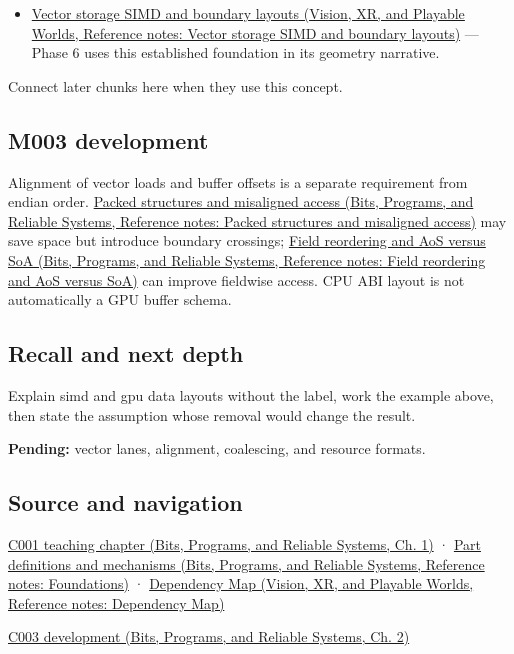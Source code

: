 \begin{itemize}
\tightlist
\item
  \href{../07-Vision-XR-and-Playable-Worlds/main.pdf\#nameddest=appendix-26bf6bf2fb8b}{Vector storage SIMD and boundary layouts (Vision, XR, and Playable Worlds, Reference notes: Vector storage SIMD and boundary layouts)} --- Phase 6 uses this established foundation in its geometry narrative.
\end{itemize}

Connect later chunks here when they use this concept.

\subsection{M003 development}\label{appendix-3c7b1a56de01-m003-development}

Alignment of vector loads and buffer offsets is a separate requirement from endian order. \href{../01-Bits-Programs-and-Reliable-Systems/main.pdf\#nameddest=appendix-0682dbfc5f0e}{Packed structures and misaligned access (Bits, Programs, and Reliable Systems, Reference notes: Packed structures and misaligned access)} may save space but introduce boundary crossings; \href{../01-Bits-Programs-and-Reliable-Systems/main.pdf\#nameddest=appendix-5522ad176ca0}{Field reordering and AoS versus SoA (Bits, Programs, and Reliable Systems, Reference notes: Field reordering and AoS versus SoA)} can improve fieldwise access. CPU ABI layout is not automatically a GPU buffer schema.

\subsection{Recall and next depth}\label{appendix-3c7b1a56de01-recall-and-next-depth}

Explain simd and gpu data layouts without the label, work the example above, then state the assumption whose removal would change the result.

\textbf{Pending:} vector lanes, alignment, coalescing, and resource formats.

\subsection{Source and navigation}\label{appendix-3c7b1a56de01-source-and-navigation}

\href{../01-Bits-Programs-and-Reliable-Systems/main.pdf\#nameddest=01-foundations-i-ch001-from-a-signal-to-an-interpretation}{C001 teaching chapter (Bits, Programs, and Reliable Systems, Ch. 1)} · \href{../01-Bits-Programs-and-Reliable-Systems/main.pdf\#nameddest=appendix-fd090d982a15}{Part definitions and mechanisms (Bits, Programs, and Reliable Systems, Reference notes: Foundations)} · \href{../07-Vision-XR-and-Playable-Worlds/main.pdf\#nameddest=appendix-4ad47bdd269a}{Dependency Map (Vision, XR, and Playable Worlds, Reference notes: Dependency Map)}

\href{../01-Bits-Programs-and-Reliable-Systems/main.pdf\#nameddest=01-foundations-i-ch002-where-the-bytes-live}{C003 development (Bits, Programs, and Reliable Systems, Ch. 2)}
